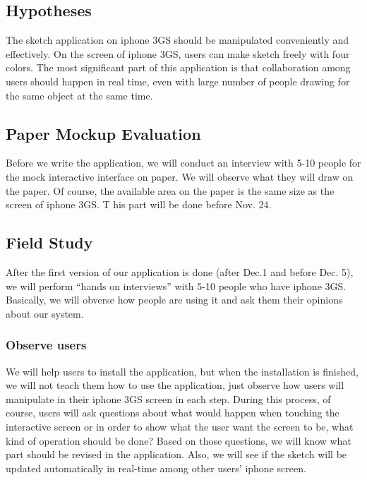 \documentclass{www2010-submission}
\begin{document}
\subsection{Hypotheses}

The sketch application on iphone 3GS should be manipulated conveniently and
effectively. On the screen of iphone 3GS, users can make sketch freely with
four colors. The most significant part of this application is that
collaboration among  users should happen in real time, even with large number
of people drawing for the same object at the same time.

\subsection{Paper Mockup Evaluation}

Before we write the application, we will conduct an interview with 5-10 people
for the mock interactive interface on paper. We will observe what they will
draw on the paper. Of course, the available area on the paper is the same size
as the screen of iphone 3GS. T his part will be done before Nov. 24.

\subsection{Field Study}

After the first version of our application is done (after Dec.1 and before Dec.
5), we will perform ``hands on interviews'' with 5-10 people who have iphone
3GS.  Basically, we will obverse how people are using it and ask them their
opinions about our system.

\subsubsection{Observe users}

We will help users to install the application, but when the installation is
finished, we will not teach them how to use the application, just observe how
users will manipulate in their iphone 3GS screen in each step. During this
process, of course, users will ask questions about what would happen when
touching the interactive screen or in order to show what the user want the
screen to be, what kind of operation should be done? Based on those questions,
we will know what part should be revised in the application. Also, we will see
if the sketch will be updated automatically in real-time among other users'
iphone screen.
\end{document}
